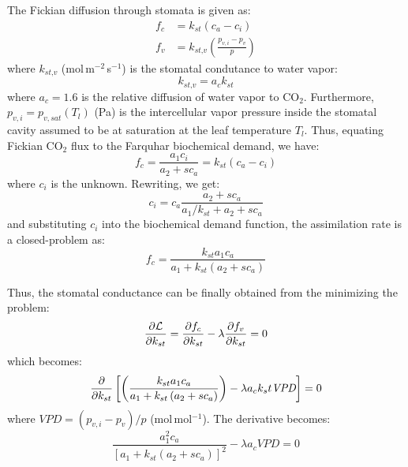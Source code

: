 The Fickian diffusion through stomata is given as:
\begin{align}
f_c &= k_{\textit{st}} \left(c_a - c_i\right) \\
f_v &= k_{\textit{st,v}} \left(\frac{p_{v,i} - p_v}{p}\right)
\end{align}
where $k_{\textit{st,v}}$ (mol\,m$^{-2}$\,s$^{-1}$) is the stomatal condutance to water vapor:
\begin{equation}
k_{\textit{st,v}} = a_c k_{\textit{st}} 
\end{equation}
where $a_c = 1.6$ is the relative diffusion of water vapor to CO$_2$. Furthermore, $p_{v,i} = p_{v,sat}\left(T_l\right)$ (Pa) is the intercellular vapor pressure inside the stomatal cavity assumed to be at saturation at the leaf temperature $T_l$. Thus, equating Fickian CO$_2$ flux to the Farquhar biochemical demand, we have:
\begin{equation}
f_c = \frac{a_1 c_i}{a_2 + s c_a} = k_{st} \left(c_a - c_i\right)
\end{equation}
where $c_i$ is the unknown. Rewriting, we get:
\begin{equation}
c_i = c_a \frac{a_2 + s c_a}{a_1/k_{st} + a_2 + s c_a}
\end{equation}
and substituting $c_i$ into the biochemical demand function, the assimilation rate is a closed-problem as:
\begin{equation}
f_c = \frac{k_{st} a_1 c_a}{a_1 + k_{st} \left(a_2 + s c_a\right)}
\end{equation}

Thus, the stomatal conductance can be finally obtained from the minimizing the problem:
\begin{equation}
\frac{\partial \mathcal{L}}{\partial k_{st}} = \frac{\partial f_c}{\partial k_{st}} - \lambda \frac{\partial f_v}{\partial k_{st}} = 0
\end{equation}
which becomes:
\begin{equation}
\frac{\partial }{\partial k_{st}} \left[ \left(\frac{k_{st} a_1 c_a}{a_1 + k_{st} \left(a_2 + s c_a\right)}\right)- \lambda a_c k_st \textit{VPD} \right] = 0
\end{equation}
where $\textit{VPD} = \left(p_{v,i} - p_v \right)/p$ (mol\,mol$^{-1}$). The derivative becomes:
\begin{equation}
\frac{a_1^2 c_a}{\left[a_1 + k_{st} \left(a_2 + s c_a\right)\right]^2}- \lambda a_c \textit{VPD} = 0
\end{equation}

